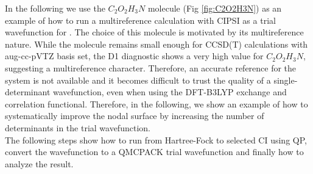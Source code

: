 In the following we use the $C_2O_2H_3N$ molecule (Fig \ref{fig:C2O2H3N}) as an example of how to run a multireference calculation with CIPSI as a trial wavefunction for \qmcpack. The choice of this molecule is motivated by its multireference nature. While the molecule remains small enough for CCSD(T) calculations with aug-cc-pVTZ basis set, the D1 diagnostic shows a very high value for  $C_2O_2H_3N$, suggesting a multireference character.  Therefore, an accurate reference for the system is not available and it becomes difficult to trust the quality of a single-determinant wavefunction, even when using the DFT-B3LYP exchange and correlation functional. Therefore, in the following, we show an example of how to systematically improve the nodal surface by increasing the number of determinants in the trial wavefunction.\\

The following steps show how to run from Hartree-Fock to selected CI using QP, convert the wavefunction to a QMCPACK trial wavefunction and finally how to analyze the result.

